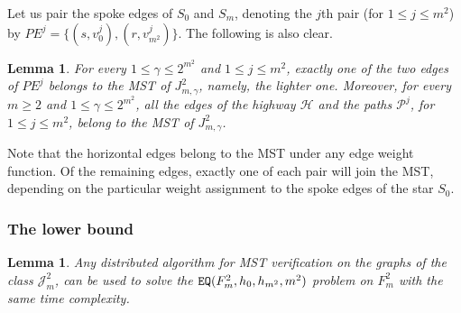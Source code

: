 \documentclass[11pt,letter]{article}
\def\EQ{\mbox{\tt EQ}}
\def\cP{\mathcal{P}}
\def\cH{\mathcal{H}}
\def\cJ{\mathcal{J}}
\newtheorem{lemma}[theorem]{Lemma}
\begin{document}
Let us pair the spoke edges of $S_0$ and $S_m$, denoting the $j$th
pair (for $1\le j\le m^2$) by
$PE^j = \{(s,v_0^j),(r,v_{m^2}^j)\}$.
The following is also clear.
\begin{lemma}
\label{finWE}
For every $1\le\gamma \le 2^{m^2}$ and $1 \le j \le m^2$, exactly
one of the two edges of $PE^j$
belongs to the MST of $J^2_{m,\gamma}$, namely, the lighter one.
Moreover, for every $m\ge 2$ and $1\le\gamma \le 2^{m^2}$,
all the edges of the highway $\cH$ and the paths $\cP^j$,
for $1\le j\le m^2$, belong to the MST of $J^2_{m,\gamma}$.
\end{lemma}

Note that the horizontal edges belong to the MST under any edge weight 
function. Of the remaining edges, exactly one of each pair will join the MST,
depending on the particular weight assignment to the spoke edges of
the star $S_0$.

\subsubsection{The lower bound}

\begin{lemma}
\label{reduc2}
Any distributed algorithm for  MST verification on the graphs of the
class $\cJ_m^2$, can be used to solve the
$\EQ(F_m^2,h_0,h_{m^2},m^2)$ problem on $F_m^2$ with the same
time complexity.
\end{lemma}
\end{document}
